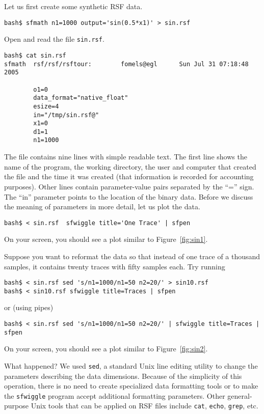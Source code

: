 Let us first create some synthetic RSF data.
\begin{verbatim}
bash$ sfmath n1=1000 output='sin(0.5*x1)' > sin.rsf
\end{verbatim}

Open and read the file \texttt{sin.rsf}.
\begin{verbatim}
bash$ cat sin.rsf
sfmath  rsf/rsf/rsftour:        fomels@egl      Sun Jul 31 07:18:48 2005

        o1=0
        data_format="native_float"
        esize=4
        in="/tmp/sin.rsf@"
        x1=0
        d1=1
        n1=1000
\end{verbatim}
The file contains nine lines with simple readable text. The first line
shows the name of the program, the working directory, the user and
computer that created the file and the time it was created (that
information is recorded for accounting purposes). Other lines contain
parameter-value pairs separated by the ``='' sign. The ``in''
parameter points to the location of the binary data. Before we discuss
the meaning of parameters in more detail, let us plot the data.
\begin{verbatim}
bash$ < sin.rsf  sfwiggle title='One Trace' | sfpen
\end{verbatim}
On your screen, you should see a plot similar to Figure~\ref{fig:sin1}.

 
Suppose you want to reformat the data so that instead of one trace of a
thousand samples, it contains twenty traces with fifty samples each. Try
running
\begin{verbatim}
bash$ < sin.rsf sed 's/n1=1000/n1=50 n2=20/' > sin10.rsf 
bash$ < sin10.rsf sfwiggle title=Traces | sfpen
\end{verbatim}
or (using pipes)
\begin{verbatim}
bash$ < sin.rsf sed 's/n1=1000/n1=50 n2=20/' | sfwiggle title=Traces | sfpen
\end{verbatim}
On your screen, you should see a plot similar to Figure~\ref{fig:sin2}.


What happened? We used \texttt{sed}, a standard Unix line editing utility to
change the parameters describing the data dimensions. Because of the
simplicity of this operation, there is no need to create specialized data
formatting tools or to make the \texttt{sfwiggle} program accept additional
formatting parameters. Other general-purpose Unix tools that can be applied on
RSF files include \texttt{cat}, \texttt{echo}, \texttt{grep}, etc. 

